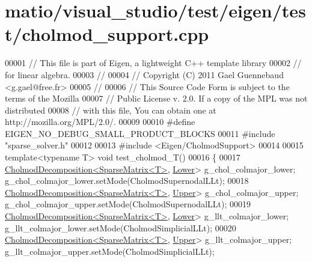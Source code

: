 \hypertarget{matio_2visual__studio_2test_2eigen_2test_2cholmod__support_8cpp_source}{}\section{matio/visual\+\_\+studio/test/eigen/test/cholmod\+\_\+support.cpp}
\label{matio_2visual__studio_2test_2eigen_2test_2cholmod__support_8cpp_source}

\begin{DoxyCode}
00001 \textcolor{comment}{// This file is part of Eigen, a lightweight C++ template library}
00002 \textcolor{comment}{// for linear algebra.}
00003 \textcolor{comment}{//}
00004 \textcolor{comment}{// Copyright (C) 2011 Gael Guennebaud <g.gael@free.fr>}
00005 \textcolor{comment}{//}
00006 \textcolor{comment}{// This Source Code Form is subject to the terms of the Mozilla}
00007 \textcolor{comment}{// Public License v. 2.0. If a copy of the MPL was not distributed}
00008 \textcolor{comment}{// with this file, You can obtain one at http://mozilla.org/MPL/2.0/.}
00009 
00010 \textcolor{preprocessor}{#define EIGEN\_NO\_DEBUG\_SMALL\_PRODUCT\_BLOCKS}
00011 \textcolor{preprocessor}{#include "sparse\_solver.h"}
00012 
00013 \textcolor{preprocessor}{#include <Eigen/CholmodSupport>}
00014 
00015 \textcolor{keyword}{template}<\textcolor{keyword}{typename} T> \textcolor{keywordtype}{void} test\_cholmod\_T()
00016 \{
00017   \hyperlink{class_eigen_1_1_cholmod_decomposition}{CholmodDecomposition<SparseMatrix<T>}, 
      \hyperlink{group__enums_gga39e3366ff5554d731e7dc8bb642f83cda891792b8ed394f7607ab16dd716f60e6}{Lower}> g\_chol\_colmajor\_lower; g\_chol\_colmajor\_lower.setMode(CholmodSupernodalLLt);
00018   \hyperlink{class_eigen_1_1_cholmod_decomposition}{CholmodDecomposition<SparseMatrix<T>}, 
      \hyperlink{group__enums_gga39e3366ff5554d731e7dc8bb642f83cda6bcb58be3b8b8ec84859ce0c5ac0aaec}{Upper}> g\_chol\_colmajor\_upper; g\_chol\_colmajor\_upper.setMode(CholmodSupernodalLLt);
00019   \hyperlink{class_eigen_1_1_cholmod_decomposition}{CholmodDecomposition<SparseMatrix<T>}, 
      \hyperlink{group__enums_gga39e3366ff5554d731e7dc8bb642f83cda891792b8ed394f7607ab16dd716f60e6}{Lower}> g\_llt\_colmajor\_lower;  g\_llt\_colmajor\_lower.setMode(CholmodSimplicialLLt);
00020   \hyperlink{class_eigen_1_1_cholmod_decomposition}{CholmodDecomposition<SparseMatrix<T>}, 
      \hyperlink{group__enums_gga39e3366ff5554d731e7dc8bb642f83cda6bcb58be3b8b8ec84859ce0c5ac0aaec}{Upper}> g\_llt\_colmajor\_upper;  g\_llt\_colmajor\_upper.setMode(CholmodSimplicialLLt);

\end{DoxyCode}
